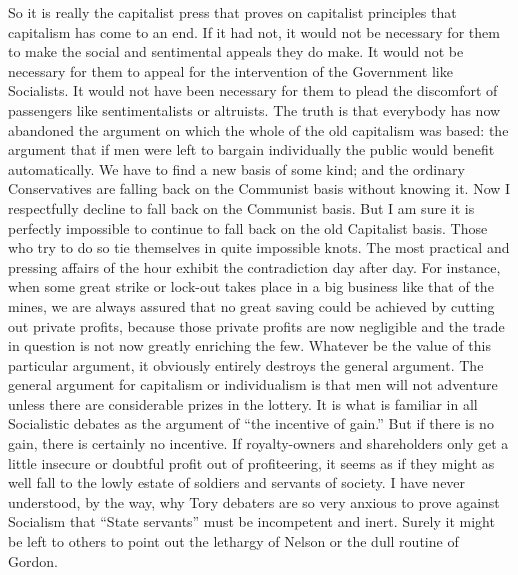 \documentclass{book}
\begin{document}
So it is really the capitalist press that proves on capitalist principles that capitalism has come to an end. If it had not, it would not be necessary for them to make the social and sentimental appeals they do make. It would not be necessary for them to appeal for the intervention of the Government like Socialists. It would not have been necessary for them to plead the discomfort of passengers like sentimentalists or altruists. The truth is that everybody has now abandoned the argument on which the whole of the old capitalism was based: the argument that if men were left to bargain individually the public would benefit automatically. We have to find a new basis of some kind; and the ordinary Conservatives are falling back on the Communist basis without knowing it. Now I respectfully decline to fall back on the Communist basis. But I am sure it is perfectly impossible to continue to fall back on the old Capitalist basis. Those who try to do so tie themselves in quite impossible knots. The most practical and pressing affairs of the hour exhibit the contradiction day after day. For instance, when some great strike or lock-out takes place in a big business like that of the mines, we are always assured that no great saving could be achieved by cutting out private profits, because those private profits are now negligible and the trade in question is not now greatly enriching the few. Whatever be the value of this particular argument, it obviously entirely destroys the general argument. The general argument for capitalism or individualism is that men will not adventure unless there are considerable prizes in the lottery. It is what is familiar in all Socialistic debates as the argument of “the incentive of gain.” But if there is no gain, there is certainly no incentive. If royalty-owners and shareholders only get a little insecure or doubtful profit out of profiteering, it seems as if they might as well fall to the lowly estate of soldiers and servants of society. I have never understood, by the way, why Tory debaters are so very anxious to prove against Socialism that “State servants” must be incompetent and inert. Surely it might be left to others to point out the lethargy of Nelson or the dull routine of Gordon.
\end{document}
